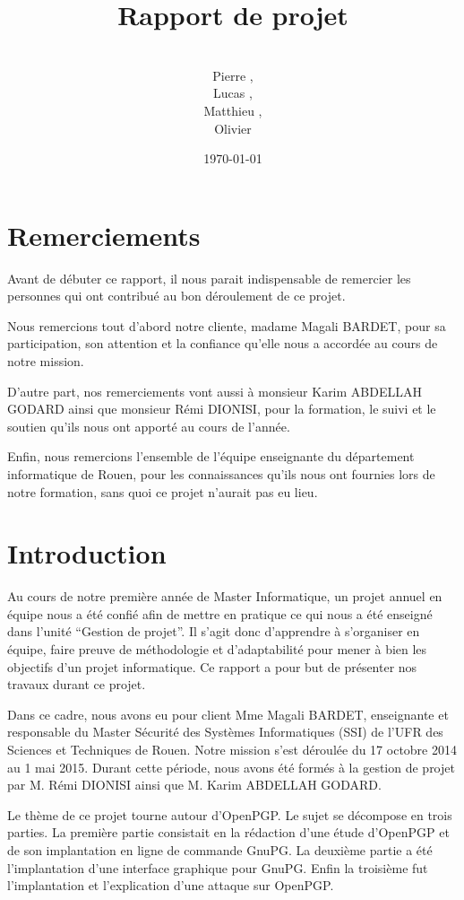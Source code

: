 \documentclass{../res/univ-projet}
\title{Rapport de projet}
\author{\\ Pierre \bsc{Balmelle},\\ Lucas \bsc{Barbay}, \\ Matthieu \bsc{Fin},
\\ Olivier \bsc{Thibault}}
\date{\today}
\begin{document}
\maketitle
\newpage
\thispagestyle{empty}
\setcounter{page}{0}
\section*{Remerciements}
Avant de débuter ce rapport, il nous parait indispensable de remercier les 
personnes qui ont contribué au bon déroulement de ce projet.

Nous remercions tout d'abord notre cliente, madame Magali BARDET, pour sa 
participation, son attention et la confiance qu'elle nous a accordée au 
cours de notre mission.

D'autre part, nos remerciements vont aussi à monsieur Karim ABDELLAH 
GODARD ainsi que monsieur Rémi DIONISI, pour la formation, le suivi 
et le soutien qu'ils nous ont apporté au cours de l'année.

Enfin, nous remercions l'ensemble de l'équipe enseignante du département 
informatique de Rouen, pour les connaissances qu'ils nous ont fournies lors 
de notre formation, sans quoi ce projet n'aurait pas eu lieu.
\newpage
\setcounter{page}{0}
\tableofcontents

\newpage

\section{Introduction}

Au cours de notre première année de Master Informatique, un projet annuel 
en équipe nous a été confié afin de mettre en pratique ce qui nous a 
été enseigné dans l'unité ``Gestion de projet''. Il s'agit donc d'apprendre 
à s'organiser en équipe, faire preuve de méthodologie et d'adaptabilité 
pour mener à bien les objectifs d'un projet informatique. Ce rapport a pour 
but de présenter nos travaux durant ce projet.

Dans ce cadre, nous avons eu pour client Mme Magali BARDET, enseignante et 
responsable du Master Sécurité des Systèmes Informatiques (SSI) de l'UFR des 
Sciences et Techniques de Rouen. Notre mission s'est déroulée du 17 octobre 
2014 au 1 mai 2015. Durant cette période, nous avons été formés à la 
gestion de projet par M. Rémi DIONISI ainsi que M. Karim ABDELLAH GODARD.

Le thème de ce projet tourne autour d'OpenPGP. Le sujet se décompose en trois 
parties. La première partie consistait en la rédaction d'une étude d'OpenPGP 
et de son implantation en ligne de commande GnuPG. La deuxième partie a été 
l'implantation d'une interface graphique pour GnuPG. Enfin la troisième fut 
l'implantation et l'explication d'une attaque sur OpenPGP.
\end{document}
